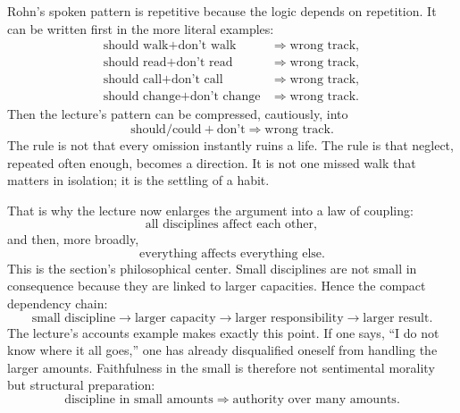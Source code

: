 Rohn's spoken pattern is repetitive because the logic depends on repetition. It can be written first in the more literal examples:
\begin{align}
\text{should walk} + \text{don't walk} &\Rightarrow \text{wrong track},\\
\text{should read} + \text{don't read} &\Rightarrow \text{wrong track},\\
\text{should call} + \text{don't call} &\Rightarrow \text{wrong track},\\
\text{should change} + \text{don't change} &\Rightarrow \text{wrong track}.
\end{align}
Then the lecture's pattern can be compressed, cautiously, into
\begin{equation}
\text{should} / \text{could} + \text{don't} \Rightarrow \text{wrong track}.
\end{equation}
The rule is not that every omission instantly ruins a life. The rule is that neglect, repeated often enough, becomes a direction. It is not one missed walk that matters in isolation; it is the settling of a habit.

That is why the lecture now enlarges the argument into a law of coupling:
\begin{equation}
\text{all disciplines affect each other},
\end{equation}
and then, more broadly,
\begin{equation}
\text{everything affects everything else}.
\end{equation}
This is the section's philosophical center. Small disciplines are not small in consequence because they are linked to larger capacities. Hence the compact dependency chain:
\begin{equation}
\text{small discipline} \to \text{larger capacity} \to \text{larger responsibility} \to \text{larger result}.
\end{equation}
The lecture's accounts example makes exactly this point. If one says, ``I do not know where it all goes,'' one has already disqualified oneself from handling the larger amounts. Faithfulness in the small is therefore not sentimental morality but structural preparation:
\begin{equation}
\text{discipline in small amounts} \Rightarrow \text{authority over many amounts}.
\end{equation}

